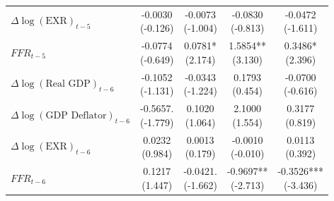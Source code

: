 \documentclass[12pt]{article}
\begin{document}
\begin{enumerate}[label=\arabic*.]
\begin{table}[htbp]
\begin{tabular}{lcccc}
        $\Delta\log(\text{EXR})_{t-5}$
        & \makecell{-0.0030\\(-0.126)}
        & \makecell{-0.0073\\(-1.004)}
        & \makecell{-0.0830\\(-0.813)}
        & \makecell{-0.0472\\(-1.611)} \\
        
        $FFR_{t-5}$
        & \makecell{-0.0774\\(-0.649)}
        & \makecell{0.0781*\\(2.174)}
        & \makecell{1.5854**\\(3.130)}
        & \makecell{0.3486*\\(2.396)} \\
        
        $\Delta\log(\text{Real GDP})_{t-6}$
        & \makecell{-0.1052\\(-1.131)}
        & \makecell{-0.0343\\(-1.224)}
        & \makecell{0.1793\\(0.454)}
        & \makecell{-0.0700\\(-0.616)} \\
        
        $\Delta\log(\text{GDP Deflator})_{t-6}$
        & \makecell{-0.5657.\\(-1.779)}
        & \makecell{0.1020\\(1.064)}
        & \makecell{2.1000\\(1.554)}
        & \makecell{0.3177\\(0.819)} \\
        
        $\Delta\log(\text{EXR})_{t-6}$
        & \makecell{0.0232\\(0.984)}
        & \makecell{0.0013\\(0.179)}
        & \makecell{-0.0010\\(-0.010)}
        & \makecell{0.0113\\(0.392)} \\
        
        $FFR_{t-6}$
        & \makecell{0.1217\\(1.447)}
        & \makecell{-0.0421.\\(-1.662)}
        & \makecell{-0.9697**\\(-2.713)}
        & \makecell{-0.3526***\\(-3.436)} \\
        

\end{tabular}
\end{table}
\end{enumerate}
\end{document}
